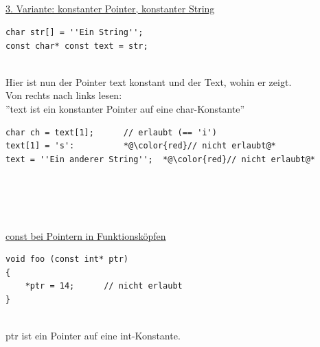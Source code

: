 \\ \\ \\ \\
\underline{3. Variante: konstanter Pointer, konstanter String}\\
\noindent
\begin{minipage}{\linewidth}
\begin{lstlisting}
char str[] = ''Ein String'';
const char* const text = str;
\end{lstlisting}
\end{minipage}
\\
Hier ist nun der Pointer text konstant und der Text, wohin er zeigt.\\
Von rechts nach links lesen:\\''text ist ein konstanter Pointer auf eine char-Konstante''\\
\noindent
\begin{minipage}{\linewidth}
\begin{lstlisting}
char ch = text[1];		// erlaubt (== 'i')
text[1] = 's':			*@\color{red}// nicht erlaubt@*
text = ''Ein anderer String'';	*@\color{red}// nicht erlaubt@*
\end{lstlisting}
\end{minipage}
\\ \\ \\ \\
\underline{const bei Pointern in Funktionsköpfen}\\
\noindent
\begin{minipage}{\linewidth}
\begin{lstlisting}
void foo (const int* ptr)
{
	*ptr = 14;		// nicht erlaubt
}
\end{lstlisting}
\end{minipage}
\\
ptr ist ein Pointer auf eine int-Konstante.
\\

